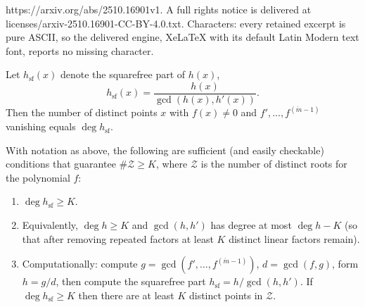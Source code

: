 \documentclass[10pt,a4paper]{amsart}
\begin{document}
https://arxiv.org/abs/2510.16901v1. A full rights notice is delivered at licenses/arxiv-2510.16901-CC-BY-4.0.txt. Characters: every retained excerpt is pure ASCII, so the delivered engine, XeLaTeX with its default Latin Modern text font, reports no missing character.
\begin{corollary}\label{cor:Practical counting via squarefree part}
Let \(h_{\mathrm{sf}}(x)\) denote the squarefree part of \(h(x)\),
\[
h_{\mathrm{sf}}(x)=\frac{h(x)}{\gcd(h(x),h'(x))}.
\]
Then the number of distinct points \(x\) with \(f(x)\neq0\) and \(f',\dots,f^{(\acute{m}-1)}\) vanishing equals \(\deg h_{\mathrm{sf}}\).
\end{corollary}

\begin{theorem}\label{thm:Sufficient and checkable conditions for at least K distinct points}
With notation as above, the following are sufficient (and easily checkable) conditions that guarantee \(\#\mathcal{Z}\ge K\), where $\mathcal{Z}$ is the number of distinct roots for the polynomial $f$:
\begin{enumerate}
  \item \(\deg h_{\mathrm{sf}}\ge K\).
  \item Equivalently, \(\deg h \ge K\) and \(\gcd(h,h')\) has degree at most \(\deg h-K\) (so that after removing repeated factors at least \(K\) distinct linear factors remain).
  \item Computationally: compute \(g=\gcd(f',\dots,f^{(\acute{m}-1)})\), \(d=\gcd(f,g)\), form \(h=g/d\), then compute the squarefree part \(h_{\mathrm{sf}}=h/\gcd(h,h')\). If \(\deg h_{\mathrm{sf}}\ge K\) then there are at least \(K\) distinct points in \(\mathcal{Z}\).
\end{enumerate}
\end{theorem}
\end{document}
